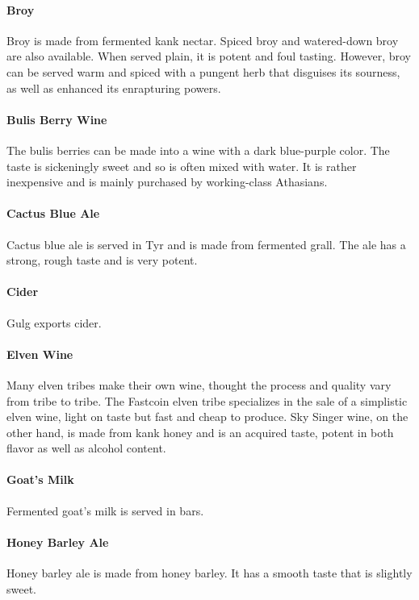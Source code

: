 \begin{multicols}{2}
\paragraph{Broy} Broy is made from fermented kank nectar. Spiced broy and watered-down broy are also available. When served plain, it is potent and foul tasting. However, broy can be served warm and spiced with a pungent herb that disguises its sourness, as well as enhanced its enrapturing powers.\\
\paragraph{Bulis Berry Wine} The bulis berries can be made into a wine with a dark blue-purple color. The taste is sickeningly sweet and so is often mixed with water. It is rather inexpensive and is mainly purchased by working-class Athasians.\\
\paragraph{Cactus Blue Ale} Cactus blue ale is served in Tyr and is made from fermented grall. The ale has a strong, rough taste and is very potent.\\
\paragraph{Cider} Gulg exports cider.\\
\paragraph{Elven Wine} Many elven tribes make their own wine, thought the process and quality vary from tribe to tribe. The Fastcoin elven tribe specializes in the sale of a simplistic elven wine, light on taste but fast and cheap to produce. Sky Singer wine, on the other hand, is made from kank honey and is an acquired taste, potent in both flavor as well as alcohol content.\\
\paragraph{Goat’s Milk} Fermented goat’s milk is served in bars.\\
\paragraph{Honey Barley Ale} Honey barley ale is made from honey barley. It has a smooth taste that is slightly sweet.\\

\end{multicols}
